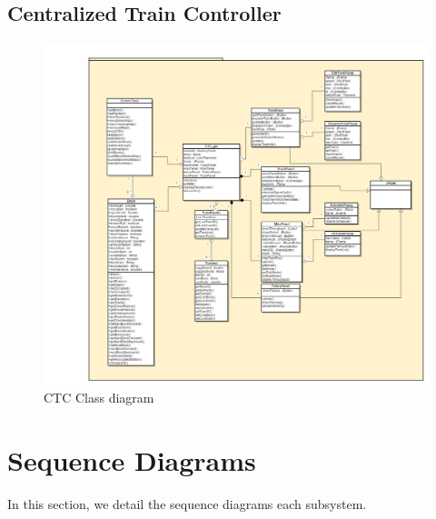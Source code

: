\documentclass[]{article}
\begin{document}
\subsection{Centralized Train Controller}
\begin{figure}[H]
	\centering
	\includegraphics[scale=.2]{ctc.png}
	\caption{CTC Class diagram}
\end{figure}


\section{Sequence Diagrams}
In this section, we detail the sequence diagrams each subsystem.
\end{document}
